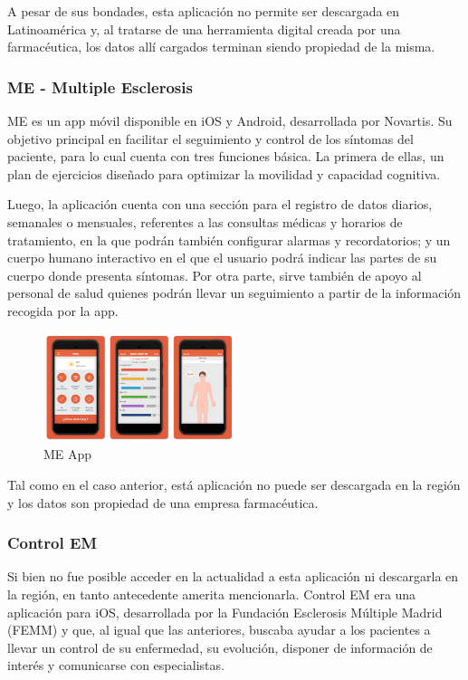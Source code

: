 A pesar de sus bondades, esta aplicación no permite ser descargada en Latinoamérica y, al tratarse de una herramienta digital creada por una farmacéutica, los datos allí cargados terminan siendo propiedad de la misma.

\subsubsection{ME - Multiple Esclerosis}

ME es un app móvil disponible en iOS y Android, desarrollada por Novartis. Su objetivo principal en facilitar el seguimiento y control de los síntomas del paciente, para lo cual cuenta con tres funciones básica. La primera de ellas, un plan de ejercicios diseñado para optimizar la movilidad y capacidad cognitiva.

Luego, la aplicación cuenta con una sección para el registro de datos diarios, semanales o mensuales, referentes a las consultas médicas y horarios de tratamiento, en la que podrán también configurar alarmas y recordatorios; y un cuerpo humano interactivo en el que el usuario podrá indicar las partes de su cuerpo donde presenta síntomas. Por otra parte, sirve también de apoyo al personal de salud quienes podrán llevar un seguimiento a partir de la información recogida por la app.

\begin{figure}[h]
    \centering
    \includegraphics[width=0.5\textwidth]{img/mercado/me.png}
    \caption{ME App} \label{Img:ME+App}
\end{figure} 

Tal como en el caso anterior, está aplicación no puede ser descargada en la región y los datos son propiedad de una empresa farmacéutica. 

\subsubsection{Control EM}

Si bien no fue posible acceder en la actualidad a esta aplicación ni descargarla en la región, en tanto antecedente amerita mencionarla. Control EM era una aplicación para iOS, desarrollada por la Fundación Esclerosis Múltiple Madrid (FEMM) y que, al igual que las anteriores, buscaba ayudar a los pacientes a llevar un control de su enfermedad, su evolución, disponer de información de interés y comunicarse con especialistas. 

